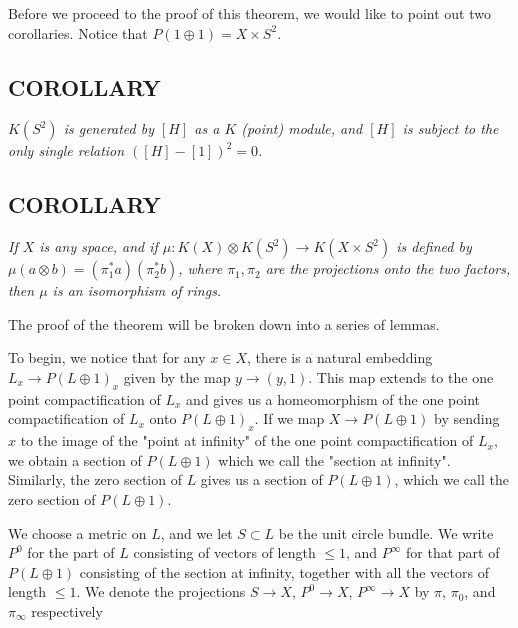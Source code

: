 Before we proceed to the proof of this theorem, we would like to point out two corollaries. Notice that $P(1 \oplus 1) = X \times S^2$. \par 

\subsection{COROLLARY}\label{cor:2.2.2} \textit{$K(S^2)$ is generated by $[H]$ as a $K$ (point) module, and $[H]$ is subject to the only single relation $([H]-[1])^2 = 0$.} \par 

\subsection{COROLLARY}\label{cor:2.2.3} \textit{If $X$ is any space, and if $\mu: K(X) \otimes K(S^2) \to K(X \times S^2)$ is defined by $\mu(a \otimes b) = (\pi^*_1 a)(\pi^*_2 b)$, where $\pi_1, \pi_2$ are the projections onto the two factors, then $\mu$ is an isomorphism of rings.} \par \hfill

The proof of the theorem will be broken down into a series of lemmas. \par

To begin, we notice that for any $x \in X$, there is a natural embedding $L_x \to P(L \oplus 1)_x$ given by the map $y \to (y, 1)$. This map extends to the one point compactification of $L_x$ and gives us a homeomorphism of the one point compactification of $L_x$ onto $P(L \oplus 1)_x$. If we map $X \to P(L \oplus 1)$ by sending $x$ to the image of the "point at infinity" of the one point compactification of $L_x$, we obtain a section of $P(L \oplus 1)$ which we call the "section at infinity". Similarly, the zero section of $L$ gives us a section of $P(L \oplus 1)$, which we call the zero section of $P(L \oplus 1)$. \par 

We choose a metric on $L$, and we let $S \subset L$ be the unit circle bundle. We write $P^0$ for the part of $L$ consisting  of vectors of length $\leq 1$, and $P^\infty$ for that part of $P(L \oplus 1)$ consisting of the section at infinity, together with all the vectors of length $\leq 1$. We denote the projections $S \to X$, $P^0 \to X$, $P^\infty \to X$ by $\pi$, $\pi_0$, and $\pi_\infty$ respectively \par 

